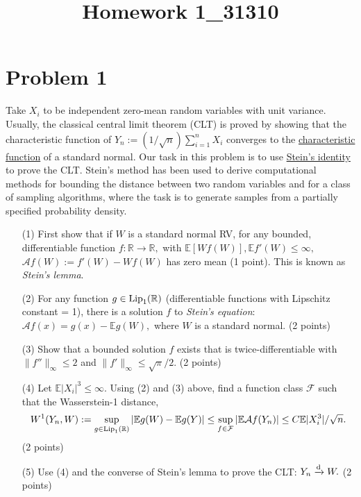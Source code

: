 \documentclass[12pt]{article}
\title{Homework 1_31310}
\renewcommand{\E}{\mathbb{E}}
\begin{document}
\MakeScribeTop

\section*{Problem 1}
Take $X_i$ to be independent zero-mean random variables with unit variance.
Usually, the classical central limit theorem (CLT) is proved by showing that the characteristic 
function of $Y_n := (1/\sqrt{n}) \sum_{i=1}^n X_i$ converges to the \href{}{characteristic function} of a 
standard normal. 
Our task in this problem is to use \href{}{Stein's identity} to prove the CLT. Stein's method has been used 
to derive computational methods for bounding the distance between two random variables and for a class 
of sampling algorithms, where the task is to generate samples from a partially specified probability density.
\begin{itemize}
	\item[(1)] First show that if $W$ is a standard normal RV, for any bounded, differentiable function $f:\mathbb{R} \to \mathbb{{R}},$ with $\E [W f(W)], \E f'(W) \leq \infty,$
				$\mathcal{A}f (W) := f'(W) -  W f(W)$ has zero mean (1 point). This is known as \emph{Stein's lemma}.
	\item[(2)] For any function $g \in {\rm Lip}_1(\mathbb{R})$ (differentiable functions with Lipschitz constant = 1), there is a solution $f$ 
				 to \emph{Stein's equation}: $\mathcal{A} f (x) = g(x) - \E g(W),$ where $W$ is a standard normal. (2 points)
	\item[(3)] Show that a bounded solution $f$ exists that is twice-differentiable with $\|f''\|_\infty \leq 2$ and $\|f'\|_\infty \leq \sqrt{\pi}/2.$ (2 points)
	\item[(4)] Let $\E|X_i|^3 \leq \infty.$ Using (2) and (3) above, find a function class $\mathcal{F}$ such that the Wasserstein-1 distance,
	 $$ W^1(Y_n, W) := \sup_{g \in {\rm Lip}_1(\mathbb{R})} |\E g(W) - \E g(Y)| \leq \sup_{f \in \mathcal{F}} |\E\mathcal{A} f(Y_n)| \leq C \E|X_i^3|/\sqrt{n}. $$ (2 points)
	\item[(5)] Use (4) and the converse of Stein's lemma to prove the CLT: $Y_n \xrightarrow[]{\rm d} W.$ (2 points) 
\end{itemize}
\end{document}
